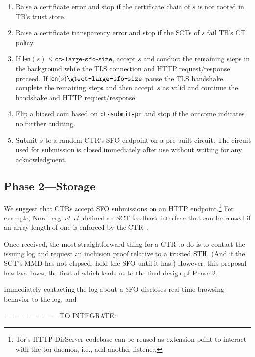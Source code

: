 \begin{enumerate}
    \item Raise a certificate error and stop if the certificate chain of $s$
        is not rooted in TB's trust store.
    \item Raise a certificate transparency error and stop if the SCTs of $s$
        fail TB's CT policy.
    \item If $\mathsf{len}(s) \le \texttt{ct-large-sfo-size}$, accept $s$ and
        conduct the remaining steps in the background while the TLS connection
        and HTTP request/response proceed. If $\mathsf{len}(s) \gte \texttt{ct-large-sfo-size}$ pause the TLS handshake, complete the remaining steps and then
        accept~$s$ as valid and continue the handshake and HTTP request/response.
    \item Flip a biased coin based on \texttt{ct-submit-pr} and stop if the
        outcome indicates no further auditing.
    \item Submit $s$ to a random CTR's SFO-endpoint on a pre-built circuit.
        The circuit used for submission is closed immediately after use without
        waiting for any acknowledgment.
\end{enumerate}

\subsection{Phase 2---Storage} \label{sec:base:phase2}

We suggest that CTRs accept SFO submissions on an HTTP endpoint.\footnote{%
    Tor's HTTP DirServer codebase can be reused as extension point to interact
    with the tor daemon, i.e., add another listener.
} For example, Nordberg~\emph{et~al.} defined an SCT feedback interface that can
be reused if an array-length of one is enforced by the CTR~\cite{nordberg}.

Once received, the most straightforward thing for a CTR to do is to contact the
issuing log and request an inclusion proof relative to a trusted STH. (And if the
SCT's MMD has not elapsed, hold the SFO until it has.) However, this proposal has
two flaws, the first of which leads us to the final design pf Phase 2.

Immediately contacting the log about a SFO discloses real-time browsing behavior
to the log, and 

==========
TO INTEGRATE:

